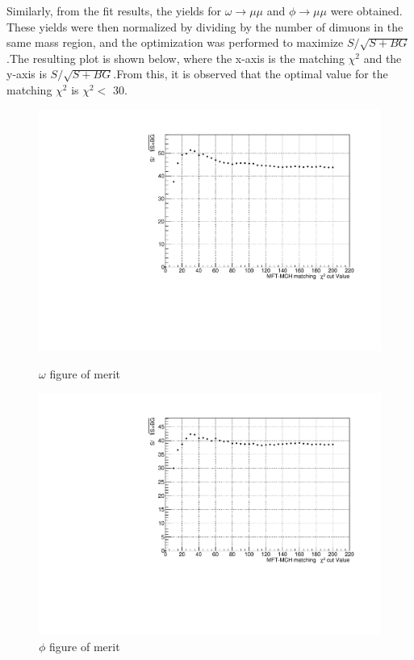             Similarly, from the fit results, the yields for $\omega \rightarrow \mu\mu$ and $\phi \rightarrow \mu\mu$ were obtained. These yields were then normalized by dividing by the number of dimuons in the same mass region, and the optimization was performed to maximize $S/\sqrt{S+BG}$.\@ The resulting plot is shown below, where the x-axis is the matching $\chi^2$ and the y-axis is $S/\sqrt{S+BG}$.\@ From this, it is observed that the optimal value for the matching $\chi^2$ is $\chi^2 <$ 30.\@
            \begin{figure}[htbp]
                \centering
                \begin{minipage}{0.45\textwidth} %
                    \centering
                    \includegraphics[width=\textwidth]{fig/3_4_4_omega_significance.pdf} %
                    \caption{$\omega$ figure of merit}
                    \label{fig:omega_significance}
                \end{minipage}
                \hfill
                \begin{minipage}{0.45\textwidth}
                    \centering
                    \includegraphics[width=\textwidth]{fig/3_4_4_phi_significance.pdf} %
                    \caption{$\phi$ figure of merit}
                    \label{fig:phi_significance}
                \end{minipage}
            \end{figure}
